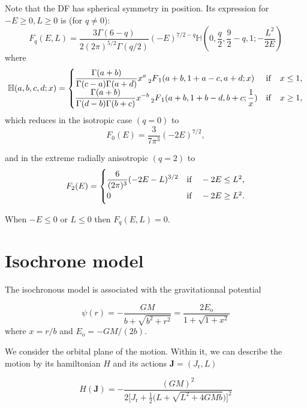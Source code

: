 \documentclass[11pt]{article}
\newcommand{\ro}{\mathrm{o}}
\newcommand{\Eo}{E_{\ro}}
\newcommand{\Fq}{F_{q}}
\newcommand{\mH}{\mathbb{H}}
\newcommand{\HG}{\prescript{}{2}F_{1}}
\newcommand{\Jr}{J_{\mathrm{r}}}
\newcommand{\bJ}{\boldsymbol{J}}
\begin{document}
Note that the DF has spherical symmetry in position. Its expression for $-E \geq 0, L \geq 0$
is (for $q \neq0$):
\begin{equation}
  \Fq(E,L)=\frac{3\Gamma(6-q)}{2(2\pi)^{5/2}\Gamma(q/2)}(-E)^{7/2-q}\mH(0,\frac{q}{2},\frac{9}{2}-q,1;-\frac{L^{2}}{2E})
  \label{eq:def_Fq}
\end{equation}
where
\begin{equation}
\mH(a,b,c,d;x)=\begin{cases}
\displaystyle{\frac{\Gamma(a+b)}{\Gamma(c-a)\Gamma(a+d)}x^{a} \HG(a+b,1+a-c,a+d;x)} & {\rm{if}} \quad x\leq1 ,\\
\displaystyle{\frac{\Gamma(a+b)}{\Gamma(d-b)\Gamma(b+c)}x^{-b} \HG(a+b,1+b-d,b+c;\frac{1}{x})} &{\rm{if}} \quad x\geq1 ,
\end{cases}
\label{eq:def_H}
\end{equation}
which reduces in the isotropic case $(q=0)$ to
\begin{equation}
  F_{0}(E)=\frac{3}{7\pi^{3}}(-2E)^{7/2} ,
  \label{eq:F_q=0}
\end{equation}

and in the extreme radially anisotropic $(q=2)$ to
\begin{equation}
  F_{2}(E)=\begin{cases}
\displaystyle{ \frac{6}{(2\pi)^{3}}(-2E-L)^{3/2}} & {\rm{if}} \quad -2 E\leq L^{2} ,\\
0 &{\rm{if}} \quad - 2 E\geq L^{2} .
\end{cases}
  \label{eq:F_q=2}
\end{equation}

When $-E \leq 0$ or $L \leq 0$ then $\Fq(E,L) = 0$.

\section{Isochrone model}
\label{sec:Isochrone}

The isochronous model is associated with the gravitationnal potential

\begin{equation}
  \psi(r) = - \frac{GM}{b+\sqrt{b^{2}+r^{2}}} = \frac{2 \Eo}{1+\sqrt{1+x^{2}}}
  \label{eq:IsoPotential}
\end{equation}
where $x=r/b$ and $\Eo=-GM/(2b)$.

We consider the orbital plane of the motion. Within it, we can describe the motion by its hamiltonian $H$ and its actions $\bJ = (\Jr,L)$

\begin{equation}
  H(\bJ) = - \frac{(GM)^{2}}{2 \bigg[\Jr + \frac{1}{2} \bigg(L+\sqrt{L^{2}+4GMb}\bigg)\bigg]^{2}}
  \label{eq:HamiltionianIso}
\end{equation}
\end{document}
